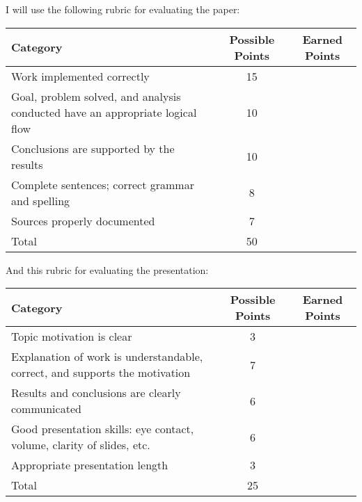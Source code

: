 \documentclass[a4paper, 12 pt]{curve}
\begin{document}
\vspace*{2 em}
I will use the following rubric for evaluating the paper:

\vspace*{1 em}
\begin{center}
\begin{tabu}{| X | c | c |}\hline
\textbf{Category} & \textbf{Possible Points} & \textbf{Earned Points} \\ \hline \hline
Work implemented correctly & 15 & \\ \hline
Goal, problem solved, and analysis conducted have an appropriate logical flow & 10 & \\ \hline
Conclusions are supported by the results & 10 & \\ \hline
Complete sentences; correct grammar and spelling & 8 & \\ \hline
Sources properly documented & 7 & \\ \hline
Total & 50 & \\\hline
\end{tabu} 
\end{center}

And this rubric for evaluating the presentation:

\vspace*{1 em}
\begin{center}
\begin{tabu}{| X | c | c |}\hline
\textbf{Category} & \textbf{Possible Points} & \textbf{Earned Points} \\ \hline \hline
Topic motivation is clear & 3 & \\ \hline
Explanation of work is understandable, correct, and supports the motivation & 7 & \\ \hline
Results and conclusions are clearly communicated & 6 & \\ \hline
Good presentation skills: eye contact, volume, clarity of slides, etc. & 6 & \\ \hline
Appropriate presentation length & 3 & \\ \hline
Total & 25 & \\\hline
\end{tabu} 
\end{center}
\end{document}
